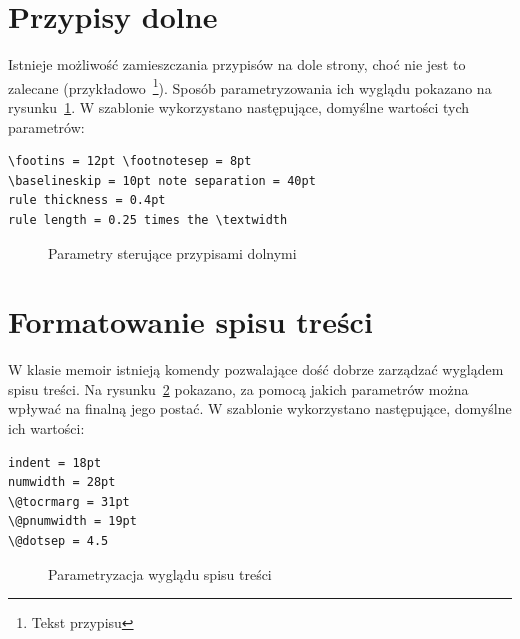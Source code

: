 \section{Przypisy dolne}
Istnieje możliwość zamieszczania przypisów na dole strony, choć nie jest to zalecane (przykładowo~\footnote{Tekst przypisu}). Sposób parametryzowania ich wyglądu pokazano na rysunku~\ref{fig:fp}. W szablonie wykorzystano następujące, domyślne wartości tych parametrów:
\begin{lstlisting}[basicstyle=\footnotesize\ttfamily]
\footins = 12pt \footnotesep = 8pt
\baselineskip = 10pt note separation = 40pt
rule thickness = 0.4pt
rule length = 0.25 times the \textwidth
\end{lstlisting}
\begin{figure}[htb]
\drawfootnote
\caption{Parametry sterujące przypisami dolnymi} \label{fig:fp}
\end{figure}


\section{Formatowanie spisu treści}
W klasie memoir istnieją komendy pozwalające dość dobrze zarządzać wyglądem spisu treści. Na rysunku~\ref{fig:ltoc} pokazano, za pomocą jakich parametrów można wpływać na finalną jego postać. W szablonie wykorzystano następujące, domyślne ich wartości:
\begin{lstlisting}[basicstyle=\footnotesize\ttfamily]
indent = 18pt 
numwidth = 28pt
\@tocrmarg = 31pt 
\@pnumwidth = 19pt
\@dotsep = 4.5
\end{lstlisting}

\begin{figure}[b]
\drawtoc
\caption{Parametryzacja wyglądu spisu treści} \label{fig:ltoc}
\end{figure}


